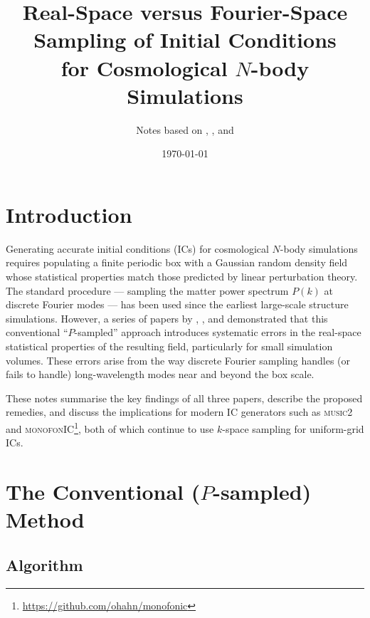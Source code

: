 \documentclass[12pt]{article}
\title{Real-Space versus Fourier-Space Sampling of Initial Conditions\\
for Cosmological $N$-body Simulations}
\author{Notes based on \citet{Pen1997}, \citet{Sirko2005}, and \citet{Hahn2011}}
\date{\today}
\begin{document}
\maketitle
\tableofcontents
\newpage

\section{Introduction}

Generating accurate initial conditions (ICs) for cosmological $N$-body
simulations requires populating a finite periodic box with a Gaussian
random density field whose statistical properties match those predicted
by linear perturbation theory. The standard procedure --- sampling the
matter power spectrum $P(k)$ at discrete Fourier modes --- has been used
since the earliest large-scale structure simulations. However, a series
of papers by \citet{Pen1997}, \citet{Sirko2005}, and \citet{Hahn2011}
demonstrated that this conventional ``$P$-sampled'' approach introduces
systematic errors in the real-space statistical properties of the
resulting field, particularly for small simulation volumes. These errors
arise from the way discrete Fourier sampling handles (or fails to handle)
long-wavelength modes near and beyond the box scale.

These notes summarise the key findings of all three papers, describe the
proposed remedies, and discuss the implications for modern IC generators
such as \textsc{music2} \citep{Hahn2011} and
\textsc{monofonIC}\footnote{\url{https://github.com/ohahn/monofonic}},
both of which continue to use $k$-space sampling for uniform-grid ICs.

\section{The Conventional ($P$-sampled) Method}
\label{sec:conventional}

\subsection{Algorithm}
\end{document}
